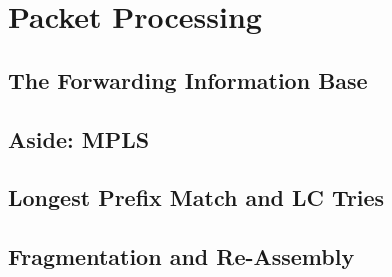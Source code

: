 \section{Packet Processing}

\subsection{The Forwarding Information Base}

\subsection{Aside: MPLS}

\subsection{Longest Prefix Match and LC Tries}

\subsection{Fragmentation and Re-Assembly}



